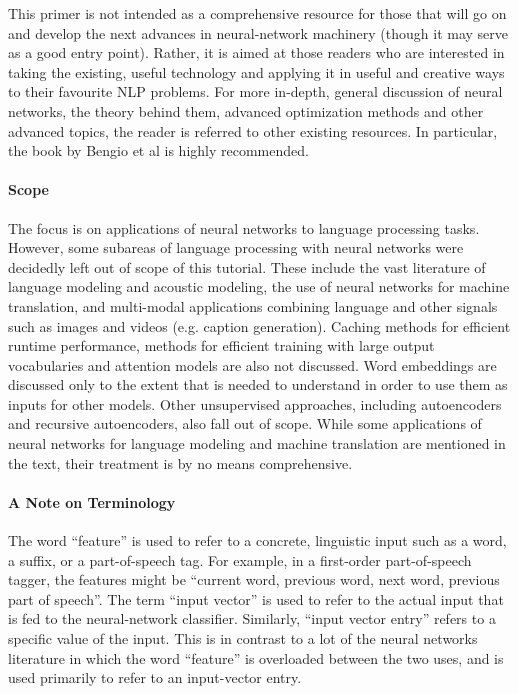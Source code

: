 \documentclass[jair,twoside,11pt,theapa]{article}
\renewcommand{\shortcite}[0]{\citeyear}
\begin{document}
This primer is not intended as a comprehensive resource for those that will go
on and develop the next advances in neural-network machinery (though it may
serve as a good entry point). Rather, it is aimed at those readers who are
interested in taking the existing, useful technology and applying it in useful
and creative ways to their favourite NLP problems.  For more in-depth, general
discussion of neural networks, the theory behind them, advanced optimization
methods and other advanced topics, the reader is referred to other existing
resources. In particular, the book by Bengio et al \shortcite{bengio2015deep} is highly
recommended.

\paragraph{Scope} The focus is on applications of neural networks to language
processing tasks.  However, some subareas of language processing with neural
networks were decidedly left out of scope of this tutorial.
These include the vast literature of language modeling and acoustic modeling,
the use of neural networks for machine translation, and multi-modal applications
combining language and other signals such as images and videos
(e.g. caption generation).  Caching methods for efficient runtime performance,
methods for efficient training with
large output vocabularies and attention models are also not discussed.
Word embeddings are discussed only to the extent that is needed to understand in order
to use them as inputs for other models.  Other unsupervised approaches, including
autoencoders and recursive autoencoders, also fall out of scope.
While some
applications of neural networks for language modeling and machine translation are
mentioned in the text, their treatment is by no means comprehensive.

\paragraph{A Note on Terminology}
The word ``feature'' is used to refer to a concrete, linguistic input such
as a word, a suffix, or a part-of-speech tag. For example, in a first-order
part-of-speech tagger, the features might be ``current word, previous word, next
word, previous part of speech''. The term ``input vector'' is used to refer to
the actual input that is fed to the neural-network classifier. Similarly,
``input vector entry'' refers to a specific value of the input. This is in contrast to
a lot of the neural networks literature in which the word ``feature'' is overloaded
between the two uses, and is used primarily to refer to an input-vector entry.
\end{document}
